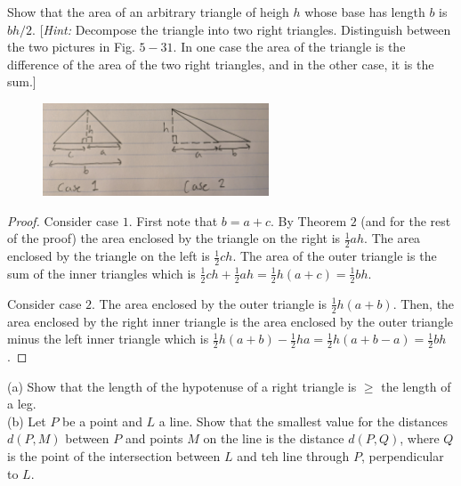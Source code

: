 \newpage
\begin{tcolorbox}[title=Problem 11, breakable]
    Show that the area of an arbitrary triangle of heigh $h$ whose base has length $b$
    is $bh/2$. [\emph{Hint:} Decompose the triangle into two right triangles. Distinguish
    between the two pictures in Fig. $5-31$. In one case the area of the triangle is the difference
    of the area of the two right triangles, and in the other case, it is the sum.]
\end{tcolorbox}

\begin{figure}[h]
    \centering
    \includegraphics[width=0.6\textwidth]{images/5_5.jpg}
\end{figure}

\begin{proof}
    Consider case $1$. First note that $b = a + c$.
    By Theorem $2$ (and for the rest of the proof) the area enclosed by the triangle on the right is $\frac{1}{2}ah$.
    The area enclosed by the triangle on the left is $\frac{1}{2}ch$.
    The area of the outer triangle is the sum of the inner triangles
        which is $\frac{1}{2}ch + \frac{1}{2}ah = \frac{1}{2}h(a + c) = \frac{1}{2}bh$.

    Consider case $2$. The area enclosed by the outer triangle is $\frac{1}{2}h(a + b)$.
    Then, the area enclosed by the right inner triangle is the area enclosed 
        by the outer triangle minus the left inner triangle which is 
            $\frac{1}{2}h(a + b) - \frac{1}{2}ha = \frac{1}{2}h(a + b - a) = \frac{1}{2}bh$.
\end{proof}

\newpage
\begin{tcolorbox}[title=Problem 12, breakable]
    (a) Show that the length of the hypotenuse of a right triangle is $\ge$ the length 
        of a leg. \\

    (b) Let $P$ be a point and $L$ a line. Show that the smallest value for the distances 
        $d(P, M)$ between $P$ and points $M$ on the line is the distance $d(P, Q)$,
        where $Q$ is the point of the intersection between $L$ and teh line through $P$,
        perpendicular to $L$.
\end{tcolorbox}

